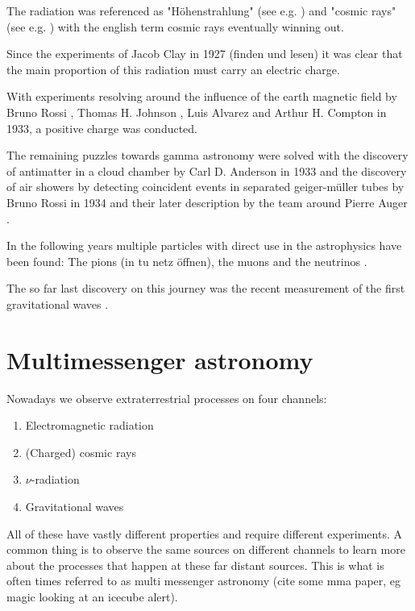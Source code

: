 The radiation was referenced as "Höhenstrahlung" 
(see e.g. \cite{myssowsky1926versuche}) 
and "cosmic rays" (see e.g. \cite{millikan1928origin}) with 
the english term cosmic rays eventually winning out.


Since the experiments of Jacob Clay in 1927 
\cite{clay1927penetrating} (finden und lesen)
it was clear that the main proportion of 
this radiation must carry an electric charge.

With experiments resolving around the influence of the earth magnetic 
field by 
Bruno Rossi \cite{Rossi1933},
Thomas H. Johnson \cite{PhysRev.43.834},
Luis Alvarez and Arthur H. Compton \cite{PhysRev.43.835}
in 1933,
a positive charge was conducted.

The remaining puzzles towards gamma astronomy were 
solved with the discovery of antimatter in a cloud chamber
by Carl D. Anderson in 1933
\cite{PhysRev.43.491}
and the discovery of air showers by detecting coincident 
events in separated geiger-müller tubes by 
Bruno Rossi in 1934
\cite{PhysRev.45.212}
and their later description by
the team around Pierre Auger 
\cite{RevModPhys.11.288}.

In the following years multiple particles with direct use in the 
astrophysics have been found:
The pions \cite{LATTES1947} (in tu netz öffnen), the muons \cite{PhysRev.52.1003}
and the neutrinos \cite{Cowan103}.

The so far last discovery on this journey
was the recent measurement of the first gravitational 
waves \cite{PhysRevLett.118.221101}.

\section{Multimessenger astronomy}

Nowadays we observe extraterrestrial processes on four channels: 
\begin{enumerate}
	\item Electromagnetic radiation
	\item (Charged) cosmic rays
	\item $\nu$-radiation
	\item Gravitational waves
\end{enumerate}

All of these have vastly different properties and require different experiments.
A common thing is to observe the same sources 
on different channels to learn more about the processes that happen at 
these far distant sources. This is what is often times 
referred to as multi messenger astronomy (cite some mma paper, eg magic looking at an icecube alert).

